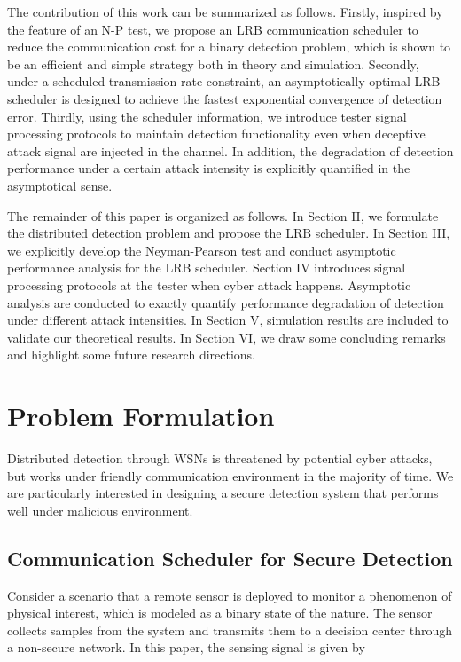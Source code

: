 \documentclass[journal]{IEEEtran}
\begin{document}
The contribution of this work can be summarized as follows. Firstly, inspired by the feature of an N-P test, we propose an LRB communication scheduler to reduce the communication cost for a binary detection problem, which is shown to be an efficient and simple strategy both in theory and simulation.
Secondly, under a scheduled transmission rate constraint, an asymptotically optimal LRB scheduler is designed to achieve the fastest exponential convergence of detection error.
Thirdly, using the scheduler information, we introduce tester signal processing protocols to maintain detection functionality even when deceptive attack signal are injected in the channel. In addition, the degradation of detection performance under a certain attack intensity is explicitly quantified in the asymptotical sense.



The remainder of this paper is organized as follows. In Section II, we formulate the distributed detection problem and propose the LRB scheduler. In Section III, we explicitly develop the Neyman-Pearson test and conduct asymptotic performance analysis for the LRB scheduler. Section IV introduces signal processing protocols at the tester when cyber attack happens. Asymptotic analysis are conducted to exactly quantify performance degradation of detection under different attack intensities. In Section V, simulation results are included to validate our theoretical results. In Section VI, we draw some concluding remarks and highlight some future research directions.



\section{Problem Formulation}
Distributed detection through WSNs is threatened by potential cyber attacks, but works under friendly communication environment in the majority of time. We are particularly interested in designing a secure detection system that performs well under malicious environment.



\label{section2}
\subsection{Communication Scheduler for Secure Detection}
Consider a scenario that a remote sensor is deployed to monitor a phenomenon of physical interest, which is modeled as a binary state of the nature. The  sensor collects samples from the system and transmits them to a decision center through a non-secure network. In this paper,  the sensing signal is given by
\end{document}
